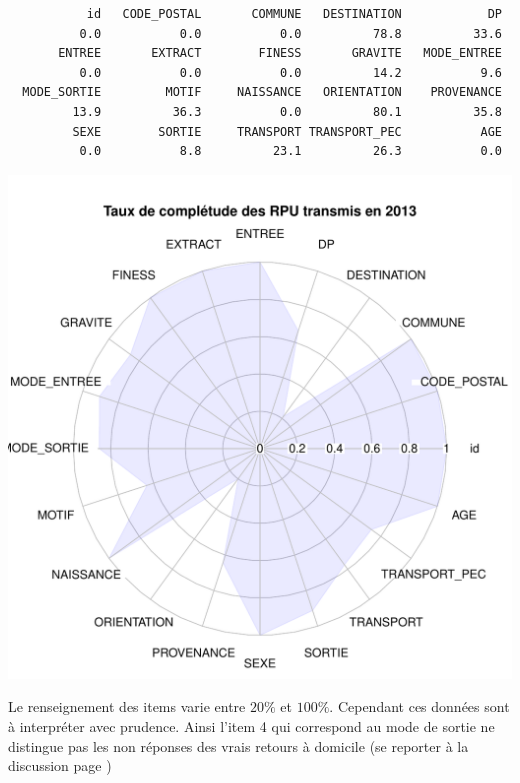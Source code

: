 \documentclass[12pt,english,french,twoside]{book}\usepackage[]{graphicx}\usepackage[]{color}
\makeatletter
\def\maxwidth{ %
  \ifdim\Gin@nat@width>\linewidth
    \linewidth
  \else
    \Gin@nat@width
  \fi
}
\newenvironment{kframe}{%
 \def\at@end@of@kframe{}%
 \ifinner\ifhmode%
  \def\at@end@of@kframe{\end{minipage}}%
  \begin{minipage}{\columnwidth}%
 \fi\fi%
 \def\FrameCommand##1{\hskip\@totalleftmargin \hskip-\fboxsep
 \colorbox{shadecolor}{##1}\hskip-\fboxsep
     \hskip-\linewidth \hskip-\@totalleftmargin \hskip\columnwidth}%
 \MakeFramed {\advance\hsize-\width
   \@totalleftmargin\z@ \linewidth\hsize
   \@setminipage}}%
 {\par\unskip\endMakeFramed%
 \at@end@of@kframe}
\newenvironment{knitrout}{}{} %
\makeatother
\begin{document}
\begin{knitrout}
\color{fgcolor}\begin{kframe}
\begin{verbatim}
           id   CODE_POSTAL       COMMUNE   DESTINATION            DP 
          0.0           0.0           0.0          78.8          33.6 
       ENTREE       EXTRACT        FINESS       GRAVITE   MODE_ENTREE 
          0.0           0.0           0.0          14.2           9.6 
  MODE_SORTIE         MOTIF     NAISSANCE   ORIENTATION    PROVENANCE 
         13.9          36.3           0.0          80.1          35.8 
         SEXE        SORTIE     TRANSPORT TRANSPORT_PEC           AGE 
          0.0           8.8          23.1          26.3           0.0 
\end{verbatim}
\end{kframe}
\includegraphics[width=\maxwidth]{figure/radar-1} 

\end{knitrout}

Le renseignement des items varie entre $20\%$ et $100\%$. Cependant ces données sont à interpréter avec prudence. Ainsi l'item 4 qui correspond au mode de sortie ne distingue pas les non réponses des vrais retours à domicile (se reporter à la discussion page \pageref{ref:sortie})
\end{document}
